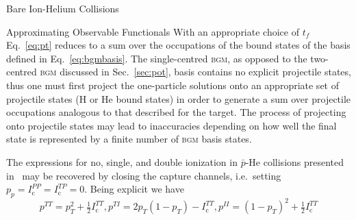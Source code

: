 \documentclass[a5paper, 9 pt]{extreport}
\begin{document}
\begin{chapter}{Bare Ion-Helium Collisions \label{chap:p-he2p-he}}
\begin{section}{Approximating Observable Functionals \label{sec:phe2p-obs}}
      With an appropriate choice of $t_f$ Eq.~\eqref{eq:pt} reduces to a sum over the occupations of the
      bound states of the basis defined in Eq.~\eqref{eq:bgmbasis}. The single-centred \textsc{bgm}, as
      opposed to the two-centred \textsc{bgm} discussed in Sec.~\ref{sec:pot}, basis contains no
      explicit projectile states, thus one must first project the one-particle solutions onto an
      appropriate set of projectile states (H or He bound states) in order to generate a sum over
      projectile occupations analogous to that described for the target. The process of projecting onto
      projectile states may lead to inaccuracies depending on how well the final state is represented by
      a finite number of \textsc{bgm} basis states.

      The expressions for no, single, and double ionization in $\bar{p}$-He collisions presented
      in~\cite{pbarhe} may be recovered by closing the capture channels, i.e.\ setting
      $p_p = I^{PP}_\mathrm{c} = I^{TP}_\mathrm{c} = 0$. Being explicit we have
      \begin{subequations} \label{eq:prob-pbarhe}
         \begin{equation} \label{eq:ptt-pbarhe}
            p^{TT} = p_T^2 + \tfrac{1}{2} I^{TT}_\mathrm{c},
         \end{equation}
         \begin{equation} \label{eq:pti-pbarhe}
            p^{TI} = 2p_T(1 - p_T) - I^{TT}_\mathrm{c},
         \end{equation}
         \begin{equation} \label{eq:pii-pbarhe}
            p^{II} = (1 - p_T)^2 + \tfrac{1}{2} I^{TT}_\mathrm{c}
         \end{equation}
      \end{subequations}


\end{section}
\end{chapter}
\end{document}
